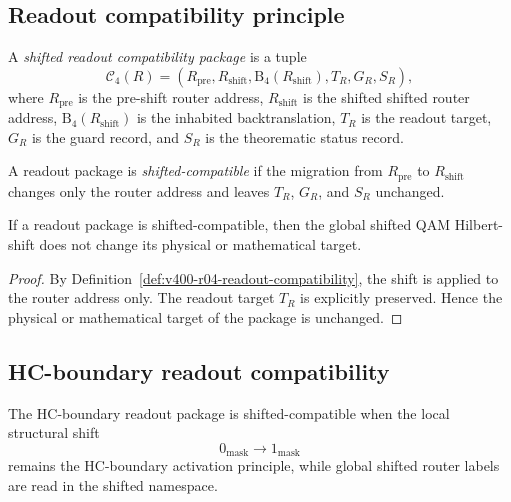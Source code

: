 \subsection{Readout compatibility principle}
\label{subsec:v400-r04-readout-compatibility-principle}

\begin{definition}
\label{def:v400-r04-readout-compatibility-package}
A \emph{shifted readout compatibility package} is a tuple
\[
 \mathcal C_4(R)
 =
 (R_{\mathrm{pre}},R_{\mathrm{shift}},\mathrm B_4(R_{\mathrm{shift}}),
 T_R,G_R,S_R),
\]
where $R_{\mathrm{pre}}$ is the pre-shift router address, $R_{\mathrm{shift}}$ is the
shifted shifted router address, $\mathrm B_4(R_{\mathrm{shift}})$ is the inhabited
backtranslation, $T_R$ is the readout target, $G_R$ is the guard record, and
$S_R$ is the theorematic status record.
\end{definition}

\begin{definition}
\label{def:v400-r04-readout-compatibility}
A readout package is \emph{shifted-compatible} if the migration from
$R_{\mathrm{pre}}$ to $R_{\mathrm{shift}}$ changes only the router address and
leaves $T_R$, $G_R$, and $S_R$ unchanged.
\end{definition}

\begin{lemma}
\label{lem:v400-r04-readout-compatibility-address-local}
If a readout package is shifted-compatible, then the global shifted QAM Hilbert-shift
does not change its physical or mathematical target.
\end{lemma}

\begin{proof}
By Definition~\ref{def:v400-r04-readout-compatibility}, the shift is applied to
the router address only. The readout target $T_R$ is explicitly preserved.
Hence the physical or mathematical target of the package is unchanged.
\end{proof}

\subsection{HC-boundary readout compatibility}
\label{subsec:v400-r04-hc-boundary-readout-compatibility}

\begin{definition}
\label{def:v400-r04-hc-boundary-compatibility-record}
The HC-boundary readout package is shifted-compatible when the local structural
shift
\[
 0_{\mathrm{mask}}\longrightarrow 1_{\mathrm{mask}}
\]
remains the HC-boundary activation principle, while global shifted router labels are
read in the shifted namespace.
\end{definition}

